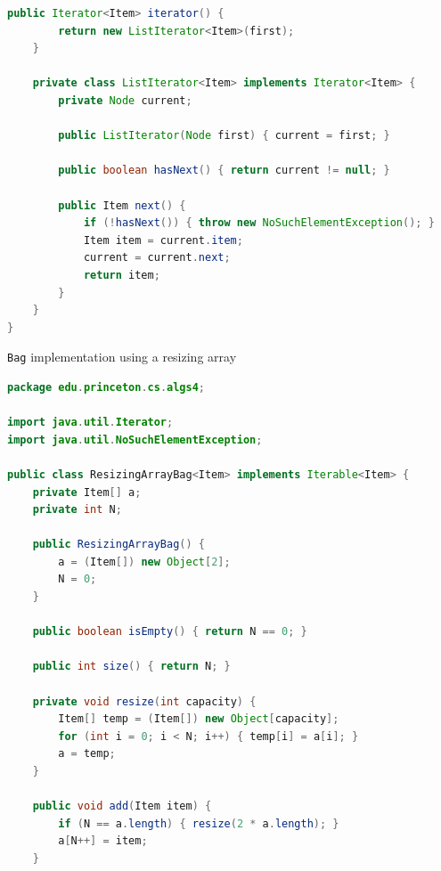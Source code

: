 \documentclass[8pt,a4paper,compress]{beamer}
\begin{document}
\begin{frame}[fragile]
\pause

\begin{lstlisting}[language=Java,style=focusin]
    public Iterator<Item> iterator() { 
        return new ListIterator<Item>(first); 
    }

    private class ListIterator<Item> implements Iterator<Item> {
        private Node current;

        public ListIterator(Node first) { current = first; }

        public boolean hasNext() { return current != null; }

        public Item next() {
            if (!hasNext()) { throw new NoSuchElementException(); }
            Item item = current.item;
            current = current.next; 
            return item;
        }
    }
}
\end{lstlisting}
\end{frame}

\begin{frame}[fragile]
\pause

\lstinline{Bag} implementation using a resizing array

\smallskip

\begin{lstlisting}[language=Java,style=focusin]
package edu.princeton.cs.algs4;

import java.util.Iterator;
import java.util.NoSuchElementException;

public class ResizingArrayBag<Item> implements Iterable<Item> {
    private Item[] a; 
    private int N;  

    public ResizingArrayBag() {
        a = (Item[]) new Object[2];
        N = 0;
    }

    public boolean isEmpty() { return N == 0; }

    public int size() { return N; }

    private void resize(int capacity) {
        Item[] temp = (Item[]) new Object[capacity];
        for (int i = 0; i < N; i++) { temp[i] = a[i]; }
        a = temp;
    }

    public void add(Item item) {
        if (N == a.length) { resize(2 * a.length); }
        a[N++] = item; 
    }
\end{lstlisting}
\end{frame}
\end{document}
